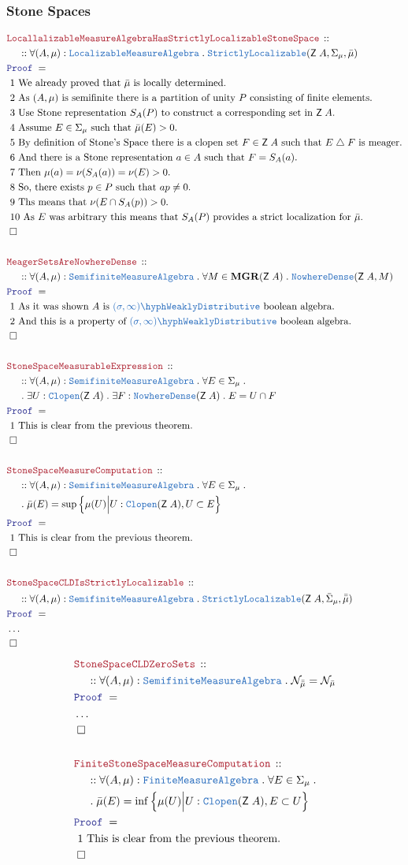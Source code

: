 \documentclass[12pt]{scrartcl}
\newcommand{\TYPE}[1]{\textcolor{NavyBlue}{\mathtt{#1}}}
\newcommand{\LOGIC}[1]{\textcolor{Blue}{\mathtt{#1}}}
\newcommand{\THM}[1]{\textcolor{Maroon}{\mathtt{#1}}}
\renewcommand{\.}{\; . \;}
\newcommand{\Theorem}[2]{& \THM{#1} \, :: \, #2 \\ & \Proof = \\ }
\newcommand{\NewLine}{\\ & \kern 1pc}
\newcommand{\Page}[1]{ \begin{align*} #1 \end{align*}   }
\newcommand{\NoProof}{ & \ldots \\ \EndProof}
\newcommand{\du}{\; \triangle \;}
\newcommand{\QED}{\; \square}
\newcommand{\EndProof}{& \QED \\}
\newcommand{\Proof}{\LOGIC{Proof} \; }
\newcommand{\Explain}[1]{& \text{#1.} \\}
\newcommand{\Finite}{\TYPE{Finite}}
\newcommand{\mgr}{\mathbf{MGR}}
\newcommand{\WD}{\TYPE{(\sigma,\infty)\hyph WeaklyDistributive}}
\newcommand{\Z}{\mathsf{Z}}
\newcommand{\ND}{\TYPE{NowhereDense}}
\newcommand{\Clopen}{\TYPE{Clopen}}
\newcommand{\Null}{\mathcal{N}}
\newcommand{\Semifinite}{\TYPE{Semifinite}}
\newcommand{\SLoc}{\TYPE{StrictlyLocalizable}}
\newcommand{\Loc}{\TYPE{Localizable}}
\newcommand{\MA}{\TYPE{MeasureAlgebra}}
\begin{document}
\subsubsection{Stone Spaces}
\Page{
	\Theorem{LocallalizableMeasureAlgebraHasStrictlyLocalizableStoneSpace}
	{
		\NewLine ::
		\forall (A,\mu) : \Loc\MA \.
		\SLoc (\Z\; A, \Sigma_\mu, \bar \mu)  	
	}
	\Explain{ 1 We already proved that $\bar \mu$ is locally determined}
	\Explain{ 2 As $(A,\mu)$ is semifinite there is a partition of  unity $P$ 
		consisting of finite elements}
	\Explain{ 3 Use Stone representation $S_A(P)$ to construct a corresponding set in $\Z\; A$}
	\Explain{ 4 Assume $E \in \Sigma_\mu$ such that $\bar \mu(E) > 0$}
	\Explain{ 5 By definition of Stone's Space there is a clopen set $F \in \Z \; A$ 
		such that $E \du F$ is meager}
	\Explain{ 6 And there is a Stone representation $a \in A$ such that $F = S_A(a)$}
	\Explain{ 7 Then $\mu(a) = \nu(S_A(a)) = \nu(E) > 0$}
	\Explain{ 8 So, there exists $p \in P$ such that $ap \neq 0$}
	\Explain{ 9 Ths means that $\nu(E \cap S_A(p)) > 0$}
	\Explain{ 10 As  $E$ was arbitrary this means that $S_A(P)$ 
		provides a strict localization for $\bar \mu$}
	\EndProof
	\\
	\Theorem{MeagerSetsAreNowhereDense}
	{
		\NewLine ::		
		\forall (A,\mu) : \Semifinite\MA \.		
		\forall  M  \in \mgr(\Z\; A)  \. 
		 \ND(\Z\;A, M)
	}
	\Explain{ 1 As it was shown $A$ is $\WD$ boolean algebra}
	\Explain{ 2 And this is a property of $\WD$ boolean algebra}
	\EndProof
	\\
	\Theorem{StoneSpaceMeasurableExpression}
	{
		\NewLine ::		
		\forall (A,\mu) : \Semifinite\MA \.		
		\forall  E \in \Sigma_\mu  \.  \NewLine \.
		\exists U : \Clopen(\Z\;A) \.
		\exists F : \ND(\Z\;A)	\.	
		E = U \cap F
	}
	\Explain{ 1 This is clear from the previous theorem}
	\EndProof
	\\
	\Theorem{StoneSpaceMeasureComputation}
	{
		\NewLine ::		
		\forall (A,\mu) : \Semifinite\MA \.		
		\forall  E \in \Sigma_\mu  \.  \NewLine \.
		\bar \mu(E) = \sup \Big\{ \mu(U) \Big| U : \Clopen(\Z\;A) , U \subset E   \Big\}
	}
	\Explain{ 1 This is clear from the previous theorem}
	\EndProof
	\\
	\Theorem{StoneSpaceCLDIsStrictlyLocalizable}
	{
		\NewLine ::
		\forall (A,\mu)  : \Semifinite\MA \.
		\SLoc(\Z \;A, \bar \Sigma_\mu, \bar{\bar \mu}) 
	}
	\NoProof
}\Page{
	\Theorem{StoneSpaceCLDZeroSets}
	{
		\NewLine ::
		\forall (A,\mu)  : \Semifinite\MA \.
		\Null_{\bar{\bar \mu}} = \Null_{\bar \mu} 
	}
	\NoProof
	\\
	\Theorem{FiniteStoneSpaceMeasureComputation}
	{
		\NewLine ::		
		\forall (A,\mu) : \Finite\MA \.		
		\forall  E \in \Sigma_\mu  \.  \NewLine \.
		\bar \mu(E) = \inf \Big\{ \mu(U) \Big| U : \Clopen(\Z\;A), E \subset U \Big\}
	}
	\Explain{ 1 This is clear from the previous theorem}
	\EndProof
}
\newpage
\end{document}
